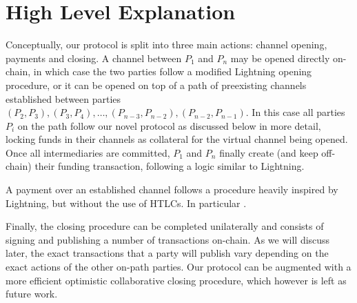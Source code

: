\section{High Level Explanation}
  Conceptually, our protocol is split into three main actions: channel opening,
  payments and closing. A channel between $P_1$ and $P_n$ may be opened directly
  on-chain, in which case the two parties follow a modified Lightning opening
  procedure, or it can be opened on top of a path of preexisting channels
  established between parties $(P_2, P_3), (P_3, P_4), \dots, (P_{n-3},
  P_{n-2}), (P_{n-2}, P_{n-1})$. In this case all parties $P_i$ on the path
  follow our novel protocol as discussed below in more detail, locking funds in
  their channels as collateral for the virtual channel being opened. Once all
  intermediaries are committed, $P_1$ and $P_n$ finally create (and keep
  off-chain) their funding transaction, following a logic similar to Lightning.

  A payment over an established channel follows a procedure heavily inspired by
  Lightning, but without the use of HTLCs. In particular \TODO{}.

  Finally, the closing procedure can be completed unilaterally and consists of
  signing and publishing a number of transactions on-chain. As we will discuss
  later, the exact transactions that a party will publish vary depending on the
  exact actions of the other on-path parties. Our protocol can be augmented with
  a more efficient optimistic collaborative closing procedure, which however is
  left as future work.

